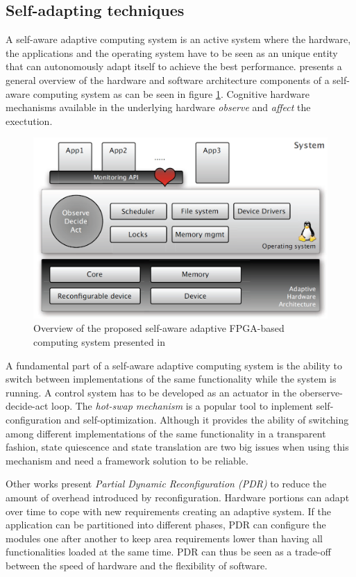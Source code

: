 \subsection{Self-adapting techniques}
\label{sec:selfadapting}

A self-aware adaptive computing system is an active system where the hardware, the applications and the operating system have to be seen as an unique entity that can autonomously adapt itself to achieve the best performance. \cite{selfaware} presents a general overview of the hardware and software architecture components of a self-aware computing system as can be seen in figure \ref{fig:selfaware}. Cognitive hardware mechanisms available in the underlying hardware \emph{observe} and \emph{affect} the exectution. 

\begin{figure}[htb]%
\includegraphics[width=\columnwidth]{Pictures/self-aware.PNG}%
\caption{Overview of the proposed self-aware adaptive FPGA-based computing system presented in \cite{selfaware}}%
\label{fig:selfaware}%
\end{figure}
A fundamental part of a self-aware adaptive computing system is the ability to switch between implementations of the same functionality while the system is running. A control system has to be developed as an actuator in the oberserve-decide-act loop. The \emph{hot-swap mechanism} is a popular tool to inplement self-configuration and self-optimization. Although it provides the ability of switching among different implementations of the same functionality in a transparent fashion, state quiescence and state translation are two big issues when using this mechanism and need a framework solution to be reliable. 

Other works present \emph{Partial Dynamic Reconfiguration (PDR)} \cite{reconfigurable} to reduce the amount of overhead introduced by reconfiguration. Hardware portions can adapt over time to cope with new requirements creating an adaptive system. If the application can be partitioned into different phases, PDR can configure the modules one after another to keep area requirements lower than having all functionalities loaded at the same time. PDR can thus be seen as a trade-off between the speed of hardware and the flexibility of software.  